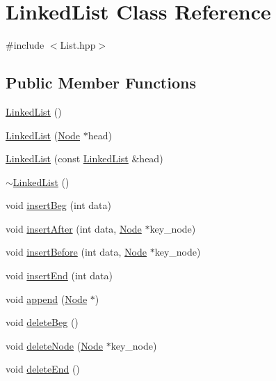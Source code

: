\hypertarget{class_linked_list}{}\section{Linked\+List Class Reference}
\label{class_linked_list}


{\ttfamily \#include $<$List.\+hpp$>$}

\subsection*{Public Member Functions}
\begin{DoxyCompactItemize}
\item 
\hyperlink{class_linked_list_afe7f78983e173f8018927cf2ad11a5aa}{Linked\+List} ()
\item 
\hyperlink{class_linked_list_ae4a0a3646caae0f7eedb6bd6d6744dbb}{Linked\+List} (\hyperlink{class_node}{Node} $\ast$head)
\item 
\hyperlink{class_linked_list_a5dd2a88ad50e83aee19dea51c8d87d90}{Linked\+List} (const \hyperlink{class_linked_list}{Linked\+List} \&head)
\item 
\hyperlink{class_linked_list_a35811ed58ff0d8d9cc9b309b8d8f5111}{$\sim$\+Linked\+List} ()
\item 
void \hyperlink{class_linked_list_a583e4bb42bb128feddb57767863fd28e}{insert\+Beg} (int data)
\item 
void \hyperlink{class_linked_list_af508f8b52bbcf1485a1552ac8fc84b81}{insert\+After} (int data, \hyperlink{class_node}{Node} $\ast$key\+\_\+node)
\item 
void \hyperlink{class_linked_list_a895ad950cc619c9cf72273e5e59a100f}{insert\+Before} (int data, \hyperlink{class_node}{Node} $\ast$key\+\_\+node)
\item 
void \hyperlink{class_linked_list_a8b87744316967b16f272be10cd6718ed}{insert\+End} (int data)
\item 
void \hyperlink{class_linked_list_a2e67fa8d36b83febafbd5f3801ec43db}{append} (\hyperlink{class_node}{Node} $\ast$)
\item 
void \hyperlink{class_linked_list_af8ccdfe634eed9feae0c641766e2e867}{delete\+Beg} ()
\item 
void \hyperlink{class_linked_list_a9a53a4d26d1c757f3d526db3fa43c2f8}{delete\+Node} (\hyperlink{class_node}{Node} $\ast$key\+\_\+node)
\item 
void \hyperlink{class_linked_list_ab624ff78c70aaa517a3a98a4e7fec288}{delete\+End} ()
\item 

\end{DoxyCompactItemize}
